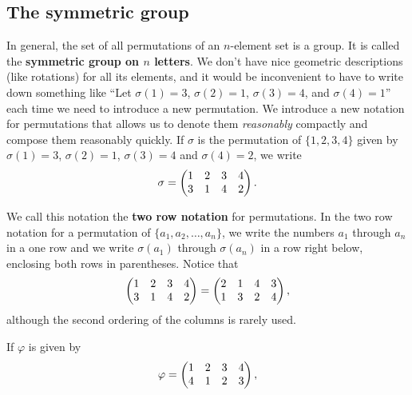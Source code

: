 \documentclass[10pt,]{book}
\newcommand{\terminology}[1]{\textbf{#1}}
\theoremstyle{plain}
\theoremstyle{definition}
\theoremstyle{definition}
\numberwithin{equation}{chapter}
\newcommand{\amp}{&}
\begin{document}
\subsection[{The symmetric group}]{The symmetric group}\label{subsection-60}
\hypertarget{p-1497}{}%
In general, the set of all permutations of an \(n\)-element set is a group. It is called the \terminology{symmetric group on \(n\) letters}. We don't have nice geometric descriptions (like rotations) for all its elements, and it would be inconvenient to have to write down something like ``Let \(\sigma(1) =3\), \(\sigma(2) =1\), \(\sigma(3)=4\), and \(\sigma(4)=1\)'' each time we need to introduce a new permutation. We introduce a new notation for permutations that allows us to denote them \emph{reasonably} compactly and compose them reasonably quickly. If \(\sigma\) is the permutation of \(\{1,2,3,4\}\) given by \(\sigma(1)=3\), \(\sigma(2)=1\), \(\sigma(3) =4\) and \(\sigma(4) =2\), we write%
\begin{equation*}
\sigma =\left( \begin{matrix}1\amp 2\amp 3\amp 4\cr3\amp 1\amp 4\amp 2
\end{matrix} \right).
\end{equation*}
%
\par
\hypertarget{p-1498}{}%
We call this notation the \terminology{two row notation} for permutations. In the two row notation for a permutation of \(\{a_1,a_2,\ldots, a_n\}\), we write the numbers \(a_1\) through \(a_n\) in a one row and we write \(\sigma(a_1)\) through \(\sigma(a_n)\) in a row right below, enclosing both rows in parentheses. Notice that%
\begin{equation*}
\left( \begin{matrix}1\amp 2\amp 3\amp 4\cr3\amp 1\amp 4\amp 2
\end{matrix} \right) = \left(
\begin{matrix}2\amp 1\amp 4\amp 3\cr1\amp 3\amp 2\amp 4
\end{matrix} \right),
\end{equation*}
although the second ordering of the columns is rarely used.%
\par
\hypertarget{p-1499}{}%
If \(\varphi\) is given by%
\begin{equation*}
\varphi = \begin{pmatrix}1\amp 2\amp 3\amp 4\cr4\amp 1\amp 2\amp 3
\end{pmatrix} ,
\end{equation*}
\end{document}
